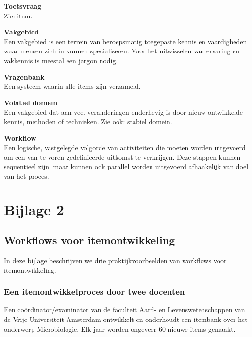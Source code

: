 \documentclass[
]{book}
\begin{document}
\textbf{Toetsvraag}\\
Zie: item.

\textbf{Vakgebied}\\
Een vakgebied is een terrein van beroepsmatig toegepaste kennis en vaardigheden waar mensen zich in kunnen specialiseren. Voor het uitwisselen van ervaring en vakkennis is meestal een jargon nodig.

\textbf{Vragenbank}\\
Een systeem waarin alle items zijn verzameld.

\textbf{Volatiel domein}\\
Een vakgebied dat aan veel veranderingen onderhevig is door nieuw ontwikkelde kennis, methoden of technieken. Zie ook: stabiel domein.

\textbf{Workflow}\\
Een logische, vastgelegde volgorde van activiteiten die moeten worden uitgevoerd om een van te voren gedefinieerde uitkomst te verkrijgen. Deze stappen kunnen sequentieel zijn, maar kunnen ook parallel worden uitgevoerd afhankelijk van doel van het proces.

\hypertarget{bijlage-2}{%
\section{Bijlage 2}\label{bijlage-2}}

\hypertarget{workflows-voor-itemontwikkeling}{%
\subsection{Workflows voor itemontwikkeling}\label{workflows-voor-itemontwikkeling}}

In deze bijlage beschrijven we drie praktijkvoorbeelden van workflows voor itemontwikkeling.

\hypertarget{een-itemontwikkelproces-door-twee-docenten}{%
\subsubsection{Een itemontwikkelproces door twee docenten}\label{een-itemontwikkelproces-door-twee-docenten}}

Een coördinator/examinator van de faculteit Aard- en Levenswetenschappen van de Vrije Universiteit Amsterdam ontwikkelt en onderhoudt een itembank over het onderwerp Microbiologie. Elk jaar worden ongeveer 60 nieuwe items gemaakt.
\end{document}
